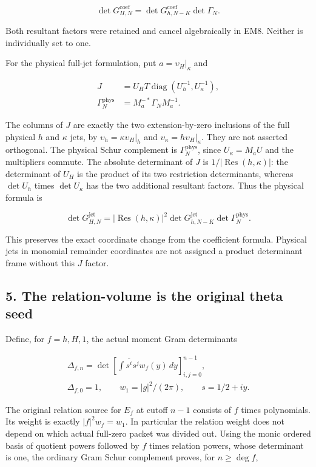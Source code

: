 \[
\det G_{H,N}^{\mathrm{coef}}=\det G_{h,N-K}^{\mathrm{coef}}\det\Gamma_N.\tag{EM8}
\]

Both resultant factors were retained and cancel algebraically in EM8.
Neither is individually set to one.

For the physical full-jet formulation, put \(a=\upsilon_H|_\kappa\) and

\[
\begin{aligned}J&=U_HT\operatorname{diag}(U_h^{-1},U_\kappa^{-1}),\\\Gamma_N^{\mathrm{phys}}&=M_a^{-*}\Gamma_NM_a^{-1}.\end{aligned}\tag{EM9}
\]

The columns of \(J\) are exactly the two extension-by-zero inclusions of
the full physical \(h\) and \(\kappa\) jets, by \(\upsilon_h=\kappa\upsilon_H|_h\)
and \(\upsilon_\kappa=h\upsilon_H|_\kappa\). They are not asserted orthogonal.
The physical Schur complement is \(\Gamma_N^{\mathrm{phys}}\), since
\(U_\kappa=M_aU\) and the multipliers commute. The absolute determinant
of \(J\) is \(1/|\operatorname{Res}(h,\kappa)|\): the determinant of \(U_H\) is the product of its
two restriction determinants, whereas \(\det U_h\) times \(\det U_\kappa\) has the
two additional resultant factors. Thus the physical formula is

\[
\det G_{H,N}^{\mathrm{jet}}=|\operatorname{Res}(h,\kappa)|^2\det G_{h,N-K}^{\mathrm{jet}}\det\Gamma_N^{\mathrm{phys}}.\tag{EM10}
\]

This preserves the exact coordinate change from the coefficient formula.
Physical jets in monomial remainder coordinates are not assigned a
product determinant frame without this \(J\) factor.

\subsection{5. The relation-volume is the original theta seed}\label{EM-the-relation-volume-is-the-original-theta-seed}

Define, for \(f=h,H,1\), the actual moment Gram determinants

\[
\begin{gathered}\Delta_{f,n}=\det\left[\int\overline{s^i}s^jw_f(y)\,dy\right]_{i,j=0}^{n-1},\\\Delta_{f,0}=1,\qquad w_1=|g|^2/(2\pi),\qquad s=1/2+iy.\end{gathered}
\]

The original relation source for \(E_f\) at cutoff \(n-1\) consists of \(f\) times
polynomials. Its weight is exactly \(|f|^2w_f=w_1\). In particular the
relation weight does not depend on which actual full-zero packet was
divided out. Using the monic ordered basis of quotient powers followed
by \(f\) times relation powers, whose determinant is one, the ordinary Gram
Schur complement proves, for \(n\ge\deg f\),

